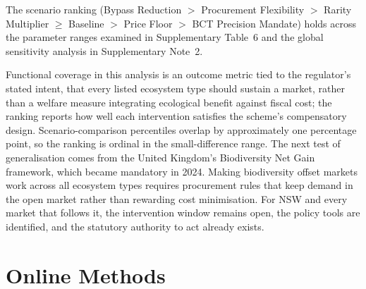 \documentclass[pdflatex,sn-nature,oneside]{sn-jnl}
\begin{document}
The scenario ranking
(Bypass Reduction $>$ Procurement Flexibility $>$ Rarity Multiplier
$\geq$ Baseline $>$ Price Floor $>$ BCT Precision Mandate) holds across
the parameter ranges examined in Supplementary Table~6 and the global
sensitivity analysis in Supplementary Note~2.

Functional coverage in this analysis is an outcome metric tied to the
regulator's stated intent, that every listed ecosystem type should sustain
a market, rather than a welfare measure integrating ecological benefit
against fiscal cost; the ranking reports how well each intervention
satisfies the scheme's compensatory design. Scenario-comparison
percentiles overlap by approximately one percentage point, so the
ranking is ordinal in the small-difference range. The next test of
generalisation comes from the United Kingdom's Biodiversity Net Gain
framework, which became mandatory in 2024.
Making biodiversity offset markets work across all ecosystem types requires
procurement rules that keep demand in the open market rather than rewarding
cost minimisation.
For NSW and every market that follows it, the intervention window remains open,
the policy tools are identified, and the statutory authority to act already exists.



\section*{Online Methods}\label{sec:methods}
\end{document}

